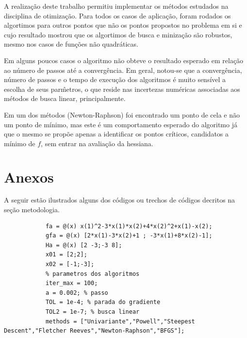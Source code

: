 \documentclass[10pt, a4paper]{article}
\begin{document}
A realiza\c c\~ao deste trabalho permitiu implementar os m\'etodos estudados na disciplina de otimiza\c c\~ao. Para todos os casos de aplica\c c\~ao, foram rodados os algortimos para outros pontos que n\~ao os pontos propostos no problema em si e cujo resultado mostrou que os algortimos de busca e miniza\c c\~ao s\~ao robustos, mesmo nos casos de fun\c c\~oes n\~ao quadr\'aticas.

Em alguns poucos casos o algoritmo n\~ao obteve o resultado esperado em rela\c c\~ao ao n\'umero de passos at\'e a converg\^encia. Em geral, notou-se que a converg\^encia, n\'umero de passos e o tempo de execu\c c\~ao dos algoritmos \'e muito sens\'ivel a escolha de seus par\^metros, o que reside nas incertezas num\'ericas associadas aos m\'etodos de busca linear, principalmente.

Em um dos m\'etodos (Newton-Raphson) foi encontrado um ponto de cela e n\~ao um ponto de m\'inimo, mas este \'e um comportamento esperado do algoritmo j\'a que o mesmo se prop\~oe apenas a identificar os pontos cr\'iticos, candidatos a m\'inimo de $f$, sem entrar na avalia\c c\~ao da hessiana.

\section{Anexos}

A seguir est\~ao ilustrados alguns dos c\'odigos ou trechos de c\'odigos decritos na se\c c\~ao metodologia.

\begin{minipage}{\linewidth}
      \begin{lstlisting}[style=myStyle, caption=script t01.m setando par\^ametros e criando as fun\c c\~oes, label=l1]
            % dados do item 01a, f, grad f, hess f e x0
            fa = @(x) x(1)^2-3*x(1)*x(2)+4*x(2)^2+x(1)-x(2);
            gfa = @(x) [2*x(1)-3*x(2)+1 ; -3*x(1)+8*x(2)-1];
            Ha = @(x) [2 -3;-3 8];
            x01 = [2;2];
            x02 = [-1;-3];
            % parametros dos algoritmos
            iter_max = 100;
            a = 0.002; % passo
            TOL = 1e-4; % parada do gradiente
            TOL2 = 1e-7; % busca linear
            methods = ["Univariante","Powell","Steepest Descent","Fletcher Reeves","Newton-Raphson","BFGS"];
      \end{lstlisting}
\end{minipage}
\end{document}
